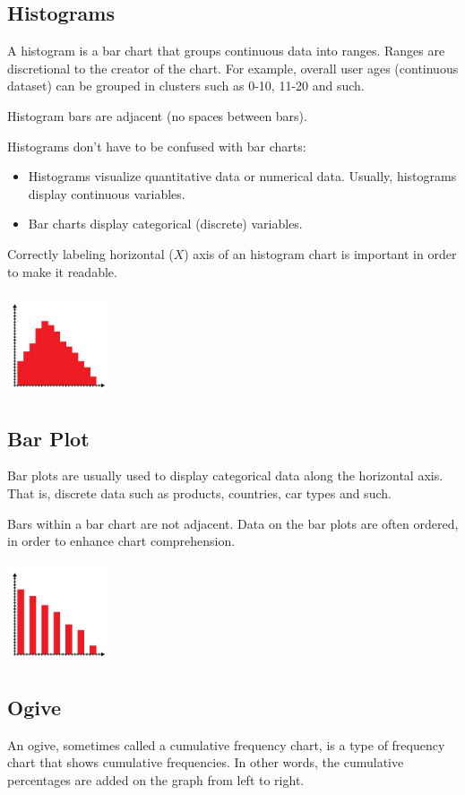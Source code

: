 \documentclass{article}
\begin{document}
\subsection{Histograms}
A histogram is a bar chart that groups continuous data into ranges. Ranges are discretional to the creator of the chart. For example, overall user ages (continuous dataset) can be grouped in clusters such as 0-10, 11-20 and such.

Histogram bars are adjacent (no spaces between bars).

Histograms don’t have to be confused with bar charts:
\begin{itemize}
    \item Histograms visualize quantitative data or numerical data. Usually, histograms display continuous variables. 
    \item Bar charts display categorical (discrete) variables. 
\end{itemize}

Correctly labeling horizontal ($X$) axis of an histogram chart is important in order to make it readable.

\includegraphics[width=3cm, height=3cm]{histogram_chart}

\subsection{Bar Plot}
Bar plots are usually used to display categorical data along the horizontal axis. That is, discrete data such as products, countries, car types and such. 

Bars within a bar chart are not adjacent. Data on the bar plots are often ordered, in order to enhance chart comprehension. 

\includegraphics[width=3cm, height=3cm]{bar_chart}

\subsection{Ogive}
An ogive, sometimes called a cumulative frequency chart, is a type of frequency chart that shows cumulative frequencies. In other words, the cumulative percentages are added on the graph from left to right.
\end{document}
